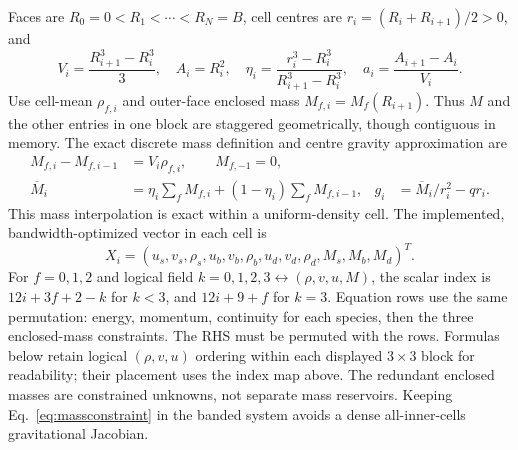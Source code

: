 \documentclass[11pt]{article}
\begin{document}
Faces are $R_0=0<R_1<\cdots<R_N=B$, cell centres are
$r_i=(R_i+R_{i+1})/2>0$, and
\begin{equation}
 V_i=\frac{R_{i+1}^3-R_i^3}{3},\quad A_i=R_i^2,\quad
 \eta_i=\frac{r_i^3-R_i^3}{R_{i+1}^3-R_i^3},\quad
 a_i=\frac{A_{i+1}-A_i}{V_i}.
\end{equation}
Use cell-mean $\rho_{f,i}$ and outer-face enclosed mass $M_{f,i}=M_f(R_{i+1})$.
Thus $M$ and the other entries in one block are staggered geometrically,
though contiguous in memory. The exact discrete mass definition and
centre gravity approximation are
\begin{align}
 M_{f,i}-M_{f,i-1}&=V_i\rho_{f,i},\qquad M_{f,-1}=0,
 \label{eq:massconstraint}\\
 \overline M_i&=\eta_i\sum_fM_{f,i}+(1-\eta_i)\sum_fM_{f,i-1},&
 g_i&=\overline M_i/r_i^2-qr_i.
\end{align}
This mass interpolation is exact within a uniform-density cell.
The implemented, bandwidth-optimized vector in each cell is
\begin{equation}
 X_i=(u_s,v_s,\rho_s,u_b,v_b,\rho_b,u_d,v_d,\rho_d,M_s,M_b,M_d)^T.
 \label{eq:ordering}
\end{equation}
For $f=0,1,2$ and logical field $k=0,1,2,3\leftrightarrow(\rho,v,u,M)$,
the scalar index is $12i+3f+2-k$ for $k<3$, and $12i+9+f$ for $k=3$.
Equation rows use the same permutation: energy, momentum, continuity
for each species, then the three enclosed-mass constraints. The RHS
must be permuted with the rows. Formulas below retain logical
$(\rho,v,u)$ ordering within each displayed $3\times3$ block for readability;
their placement uses the index map above.
The redundant enclosed masses are constrained unknowns, not separate
mass reservoirs. Keeping Eq.~\eqref{eq:massconstraint} in the banded
system avoids a dense all-inner-cells gravitational Jacobian.
\end{document}
